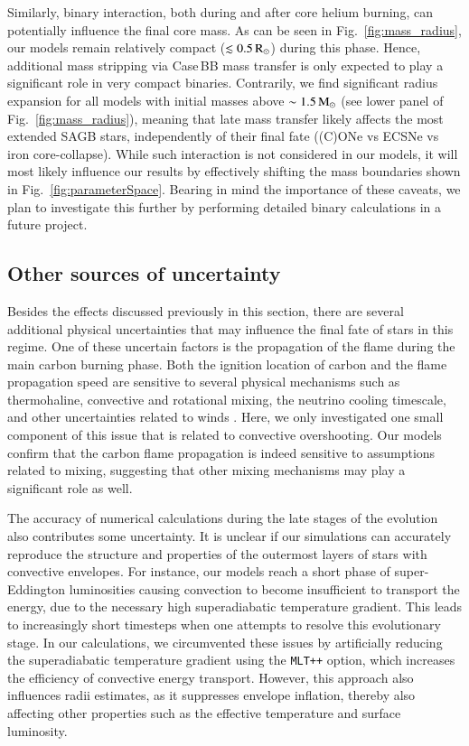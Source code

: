 \documentclass[main.tex]{subfiles}
\begin{document}
Similarly, binary interaction, both during and after core helium burning, can 
potentially influence the final core mass. As can be seen in Fig.~\ref{fig:mass_radius}, our models remain relatively compact ($\lesssim 0.5\mathrm{\,R_\odot}$) during this phase. Hence, additional mass stripping via Case\,BB mass transfer is only expected to play a significant role in very compact binaries. 
Contrarily, we find significant radius expansion for all models with initial masses above $\sim 1.5\mathrm{\,M_\odot}$ (see lower panel of Fig.~\ref{fig:mass_radius}), meaning that late mass transfer likely affects the most extended SAGB stars, independently of their final fate ((C)ONe \ias vs ECSNe vs iron core-collapse). While such interaction is not considered in our models, it will most likely influence our results by effectively shifting  the mass boundaries shown in Fig.~\ref{fig:parameterSpace}. 
Bearing in mind the importance of these caveats, we plan to investigate this further by performing detailed binary calculations in a future project.


\subsection{Other sources of uncertainty}\label{sec:uncertainties}

Besides the effects discussed previously in this section, there are several additional physical uncertainties that may influence the final fate of stars in this regime. 
One of these uncertain factors is the propagation of the flame during the main  carbon burning phase. 
Both the ignition location of carbon and the flame propagation speed are sensitive to several physical mechanisms such as 
thermohaline, convective and rotational mixing, the neutrino cooling timescale, and other uncertainties related to winds 
\citep[][and references therein]{Farmer:2015afs}. 
Here, we only investigated one small component of this issue that is related to convective overshooting. 
Our models confirm that the carbon flame propagation is indeed sensitive to assumptions related to mixing, 
suggesting that other mixing mechanisms may  play a significant role as well. 

The accuracy of numerical calculations during the late stages of the evolution also contributes some uncertainty. It is unclear if our simulations can accurately reproduce the structure and properties of the outermost layers of stars with convective envelopes. For instance, our models reach a short phase of super-Eddington luminosities causing convection to become insufficient to transport the energy, due to the necessary high superadiabatic temperature gradient. This leads to increasingly short timesteps when one attempts to resolve this evolutionary stage. 
In our calculations, we circumvented  these issues by artificially reducing the superadiabatic temperature gradient using the \texttt{MLT++} option, which increases the efficiency of convective energy transport. 
However, this approach also influences radii  estimates, as it suppresses envelope inflation, thereby also affecting other properties such as the effective temperature and surface luminosity. 
\end{document}
